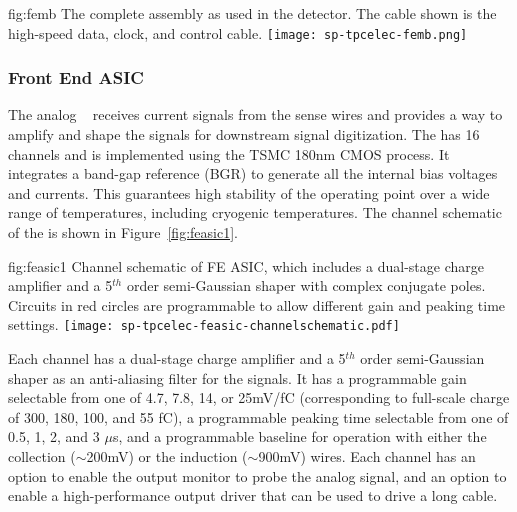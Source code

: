 \begin{dunefigure}
{fig:femb}
{The complete  assembly as used in the  detector. The cable shown is the high-speed data, clock, and control cable.}
\texttt{[image: sp-tpcelec-femb.png]}
\end{dunefigure}

\subsubsection{Front End ASIC}
\label{sec:fdsp-tpcelec-design-femb-fe}

The analog  ~\cite{DeGeronimo:2011zz} receives current signals from the  sense wires and provides a way to amplify and shape the signals for downstream signal digitization.  The   has 16 channels and is implemented using the TSMC 180nm CMOS process. It integrates a band-gap reference (BGR)  to generate all the internal bias voltages and currents. This guarantees high stability of the operating point over a wide range of temperatures, including cryogenic temperatures. The channel schematic of the   is shown in Figure~\ref{fig:feasic1}. 

\begin{dunefigure}
{fig:feasic1}
{Channel schematic of FE ASIC, which includes a dual-stage charge amplifier and a 5$^{th}$ order semi-Gaussian shaper with complex conjugate poles. Circuits in red circles are programmable to allow different gain and peaking time settings.}
\texttt{[image: sp-tpcelec-feasic-channelschematic.pdf]}
\end{dunefigure}

Each   channel has a dual-stage charge amplifier and a 5$^{th}$ order semi-Gaussian shaper as an anti-aliasing filter for the  signals. It has a programmable gain selectable from one of 4.7, 7.8, 14, or 25mV/fC (corresponding to full-scale charge of 300, 180, 100, and 55 fC), a programmable peaking time selectable from one of 0.5, 1, 2, and 3 $\mu$s, and a programmable baseline for operation with either the collection ($\sim$200mV) or the induction ($\sim$900mV) wires. Each channel has an option to enable the output monitor to probe the analog signal, and an option to enable a high-performance output driver that can be used to drive a long cable. 


